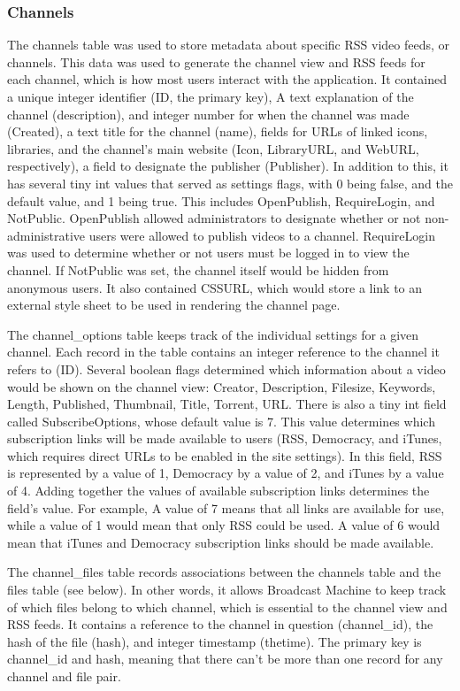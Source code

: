\documentclass[a4paper,12pt]{report}
\begin{document}
\subsubsection{Channels}
The channels table was used to store metadata about specific RSS video feeds, or channels. This data was used to generate the channel view and RSS feeds for each channel, which is how most users interact with the application. 
It contained a unique integer identifier (ID, the primary key), A text explanation of the channel (description), and integer number for when the channel was made (Created), a text title for the channel (name), fields for URLs of linked icons, libraries, and the channel's main website (Icon, LibraryURL, and WebURL, respectively), a field to designate the publisher (Publisher). In addition to this, it has several tiny int values that served as settings flags, with 0 being false, and the default value, and 1 being true. This includes OpenPublish, RequireLogin, and NotPublic. OpenPublish allowed administrators to designate whether or not non-administrative users were allowed to publish videos to a channel. RequireLogin was used to determine whether or not users must be logged in to view the channel. If NotPublic was set, the channel itself would be hidden from anonymous users.
It also contained CSSURL, which would store a link to an external style sheet to be used in rendering the channel page.


The channel\_options table keeps track of the individual settings for a given channel. Each record in the table contains an integer reference to the channel it refers to (ID). Several boolean flags determined which information about a video would be shown on the channel view: Creator, Description, Filesize, Keywords, Length, Published, Thumbnail, Title, Torrent, URL. There is also a tiny int field called SubscribeOptions, whose default value is 7. This value determines which subscription links will be made available to users (RSS, Democracy, and iTunes, which requires direct URLs to be enabled in the site settings). In this field, RSS is represented by a value of 1, Democracy by a value of 2, and iTunes by a value of 4. Adding together the values of available subscription links determines the field's value. For example, A value of 7 means that all links are available for use, while a value of 1 would mean that only RSS could be used. A value of 6 would mean that iTunes and Democracy subscription links should be made available. 


The channel\_files table records associations between the channels table and the files table (see below). In other words, it allows Broadcast Machine to keep track of which files belong to which channel, which is essential to the channel view and RSS feeds. It contains a reference to the channel in question (channel\_id), the hash of the file (hash), and integer timestamp (thetime). The primary key is channel\_id and hash, meaning that there can't be more than one record for any channel and file pair.
\end{document}
